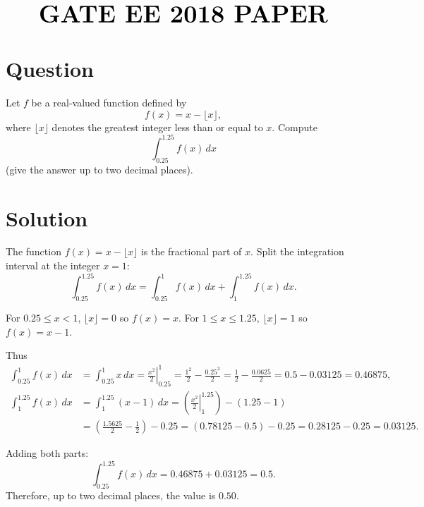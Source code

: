 \documentclass{article}
\date{\today}
\begin{document}
\thispagestyle{fancy}
\fancyhf{}
\renewcommand{\headrulewidth}{0.4pt}
\fancyfoot[c]{\thepage}
\vspace{1cm}
\begin{center}
$$\textbf{\Huge GATE EE 2018  PAPER}$$
\end{center}
\section*{Question}

Let \(f\) be a real-valued function defined by
$$
f(x)=x-\lfloor x\rfloor,
$$
where \(\lfloor x\rfloor\) denotes the greatest integer less than or equal to \(x\). Compute
$$
\int_{0.25}^{1.25} f(x)\,dx
$$
(give the answer up to two decimal places).

\section*{Solution}

The function \(f(x)=x-\lfloor x\rfloor\) is the fractional part of \(x\). Split the integration interval at the integer \(x=1\):
$$
\int_{0.25}^{1.25} f(x)\,dx
=\int_{0.25}^{1} f(x)\,dx + \int_{1}^{1.25} f(x)\,dx.
$$

For \(0.25\le x<1\), \(\lfloor x\rfloor=0\) so \(f(x)=x\).  
For \(1\le x\le 1.25\), \(\lfloor x\rfloor=1\) so \(f(x)=x-1\).

Thus
\begin{align*}
\int_{0.25}^{1} f(x)\,dx &= \int_{0.25}^{1} x\,dx
= \left.\frac{x^2}{2}\right|_{0.25}^{1}
= \frac{1^2}{2}-\frac{0.25^2}{2}
= \frac{1}{2}-\frac{0.0625}{2}
= 0.5-0.03125 = 0.46875, \\[6pt]
\int_{1}^{1.25} f(x)\,dx &= \int_{1}^{1.25} (x-1)\,dx
= \left(\left.\frac{x^2}{2}\right|_{1}^{1.25}\right) - (1.25-1) \\
&= \left(\frac{1.5625}{2}-\frac{1}{2}\right)-0.25
= (0.78125-0.5)-0.25
= 0.28125-0.25 = 0.03125.
\end{align*}

Adding both parts:
$$
\int_{0.25}^{1.25} f(x)\,dx = 0.46875 + 0.03125 = 0.5.
$$
Therefore, up to two decimal places, the value is \(\boxed{0.50}\).
\end{document}
